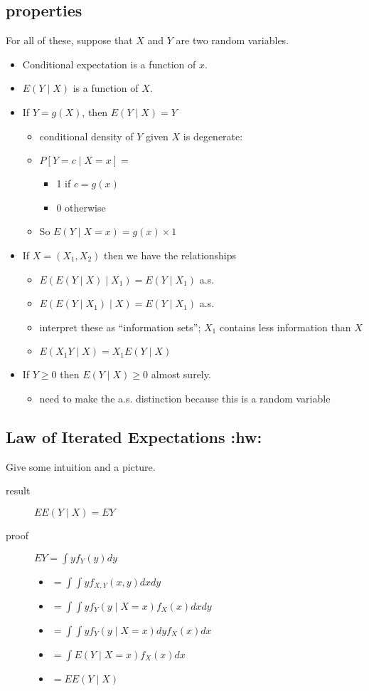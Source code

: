\documentclass[11pt]{article}
\begin{document}
\subsection{properties}
\label{sec-4-1}

     For all of these, suppose that $X$ and $Y$ are two random variables.
\begin{itemize}
\item Conditional expectation is a function of $x$.
\item $E(Y \mid X)$ is a function of $X$.
\item If $Y = g(X)$, then $E(Y \mid X) = Y$
\begin{itemize}
\item conditional density of $Y$ given $X$ is degenerate:
\item $P[Y = c \mid X = x] =$
\begin{itemize}
\item 1 if $c = g(x)$
\item 0 otherwise
\end{itemize}
\item So $E(Y \mid X = x) = g(x) \times 1$
\end{itemize}
\item If $X = (X_1, X_2)$ then we have the relationships
\begin{itemize}
\item $E(E(Y \mid X) \mid X_1) = E(Y \mid X_1)$ a.s.
\item $E(E(Y \mid X_1) \mid X) = E(Y \mid X_1)$ a.s.
\item interpret these as ``information sets''; $X_1$ contains
          less information than $X$
\item $E(X_1 Y \mid X) = X_1 E(Y \mid X)$
\end{itemize}
\item If $Y \geq 0$ then $E(Y \mid X) \geq 0$ almost surely.
\begin{itemize}
\item need to make the a.s. distinction because this is a random variable
\end{itemize}
\end{itemize}
\subsection{Law of Iterated Expectations \textbf{:hw:}}
\label{sec-4-2}

     Give some intuition and a picture.
\begin{description}
\item[result] $E E(Y \mid X) = E Y$
\item[proof] $E Y = \int y f_Y(y) dy$
\begin{itemize}
\item $= \int \int y f_{X,Y}(x,y) dx dy$
\item $= \int \int y f_Y(y \mid X = x) f_X(x) dx dy$
\item $= \int \int y f_Y(y \mid X = x) dy f_X(x) dx$
\item $= \int E(Y \mid X = x) f_X(x) dx$
\item $= E E(Y \mid X)$
\end{itemize}
\end{description}
\end{document}
